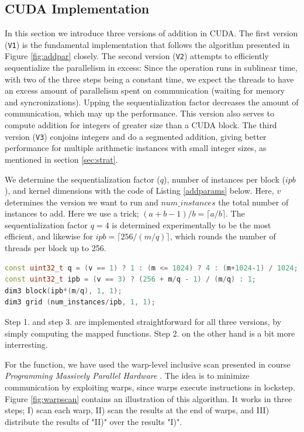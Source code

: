 \subsection{CUDA Implementation}
\label{subsec:addcud}

In this section we introduce three versions of addition in CUDA. The first
version (\texttt{V1}) is the fundamental implementation that follows the
algorithm presented in Figure \ref{fig:addpar} closely. The second version
(\texttt{V2}) attempts to efficiently sequentialize the parallelism in excess:
Since the operation runs in sublinear time, with two of the three steps being a
constant time, we expect the threads to have an excess amount of parallelism
spent on communication (waiting for memory and syncronizations). Upping the
sequentialization factor decreases the amount of communication, which may up the
performance. This version also serves to compute addition for integers of
greater size than a CUDA block. The third version (\texttt{V3}) conjoins
integers and do a segmented addition, giving better performance for multiple
arithmetic instances with small integer sizes, as mentioned in section
\ref{sec:strat}.

We determine the sequentialization factor ($q$), number of instances per block
($\mathit{ipb}$), and kernel dimensions with the code of Listing \ref{addparams}
below. Here, $v$ determines the version we want to run and
$\mathit{num\_instances}$ the total number of instances to add. Here we use a
trick; $(a + b - 1) / b = \lceil a / b \rceil$. The sequentialization factor
$q=4$ is determined experimentally to be the most efficient, and likewise for
$\mathit{ipb} = \lceil 256 / (m/q) \rceil$, which rounds the number of threads per block
up to 256.
\begin{lstlisting}[language=CPP,caption={CUDA addition parameters and kernel dimensions.},label={addparams}]
const uint32_t q = (v == 1) ? 1 : (m <= 1024) ? 4 : (m+1024-1) / 1024;
const uint32_t ipb = (v == 3) ? (256 + m/q - 1) / (m/q) : 1;
dim3 block(ipb*(m/q), 1, 1);
dim3 grid (num_instances/ipb, 1, 1);
\end{lstlisting}

Step 1. and step 3. are implemented straightforward for all three versions, by
simply computing the mapped functions. Step 2. on the other hand is a bit more
interresting.

For the  function, we have used the warp-level inclusive scan
presented in course \textit{Programming Massively Parallel Hardware}
\cite{PMPH}. The idea is to minimize communication by exploiting warps, since
warps execute instructions in lockstep. Figure \ref{fig:warpscan} contains an
illustration of this algorithm. It works in three steps; I) scan each warp, II)
scan the results at the end of warps, and III) distribute the results of "II)"
over the results "I)".

